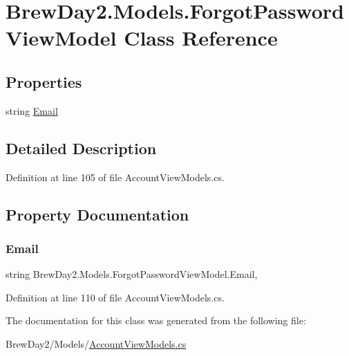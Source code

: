 \hypertarget{class_brew_day2_1_1_models_1_1_forgot_password_view_model}{}\section{Brew\+Day2.\+Models.\+Forgot\+Password\+View\+Model Class Reference}
\label{class_brew_day2_1_1_models_1_1_forgot_password_view_model}
\subsection*{Properties}
\begin{DoxyCompactItemize}
\item 
string \mbox{\hyperlink{class_brew_day2_1_1_models_1_1_forgot_password_view_model_a82e862c21947b00b8baf078411efd33a}{Email}}
\end{DoxyCompactItemize}


\subsection{Detailed Description}


Definition at line 105 of file Account\+View\+Models.\+cs.



\subsection{Property Documentation}
\mbox{\label{class_brew_day2_1_1_models_1_1_forgot_password_view_model_a82e862c21947b00b8baf078411efd33a}} 
\subsubsection{\texorpdfstring{Email}{Email}}
{\footnotesize\ttfamily string Brew\+Day2.\+Models.\+Forgot\+Password\+View\+Model.\+Email\hspace{0.3cm}{\ttfamily [get]}, {\ttfamily [set]}}



Definition at line 110 of file Account\+View\+Models.\+cs.



The documentation for this class was generated from the following file\+:\begin{DoxyCompactItemize}
\item 
Brew\+Day2/\+Models/\mbox{\hyperlink{_account_view_models_8cs}{Account\+View\+Models.\+cs}}\end{DoxyCompactItemize}
